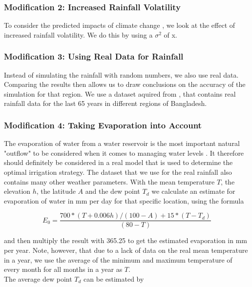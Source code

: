 \documentclass[12pt, a4paper, oneside]{article}
\begin{document}
\subsubsection{Modification 2: Increased Rainfall Volatility}
To consider the predicted impacts of climate change \citep{guhathakurta2011impact}, we look at the effect of increased rainfall volatility. 
We do this by using a  $\sigma^2$ of x.

\subsubsection{Modification 3: Using Real Data for Rainfall}
Instead of simulating the rainfall with random numbers, we also use real data.
Comparing the results then allows us to draw conclusions on the accuracy of the simulation for that region. 
We use a dataset aquired from \citep{kaggle:2019}, that contains real rainfall data for the last 65 years in different regions of Bangladesh. %

\subsubsection{Modification 4: Taking Evaporation into Account} \label{sec:intro-mod4}
The evaporation of water from a water reservoir is the most important natural "outflow" to be considered when it comes to managing water levels \citep{tanny2008evaporation}.
It therefore should definitely be considered in a real model that is used to determine the optimal irrigation strategy.
The dataset that we use for the real rainfall also contains many other weather parameters.
With the mean temperature $T$, the elevation $h$, the latitude $A$ and the dew point $T_d$ we calculate an estimate for evaporation of water in mm per day for that specific location, using the formula \citep{linacre1977simple}

\begin{equation}
	{E_0} = \frac{700 * (T + 0.006h) / (100 - A) + 15 * (T - T_d)}{(80 - T)}
\end{equation}

and then multiply the result with 365.25 to get the estimated evaporation in mm per year. 
Note, however, that due to a lack of data on the real mean temperature in a year, we use the average of the minimum and maximum temperature of every month for all months in a year as $T$. \\
The average dew point $T_d$ can be estimated by 
\end{document}
